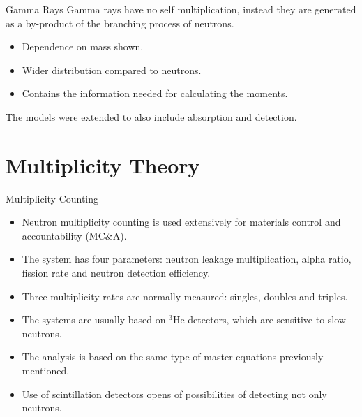 \documentclass[clock,style=horatio,paper=screen,blackslide,trans=Wipe,mode=present]{powerdot}
\begin{document}
\begin{slide}{Gamma Rays}
Gamma rays have no self multiplication, instead they are
    generated as a by-product of the branching process of
    neutrons.
{\vspace{1mm}\begin{itemize}
\item Dependence on mass shown.  \vspace{2mm}
\item Wider distribution compared to neutrons. \vspace{2mm}
\item Contains the information needed for calculating the moments.
\end{itemize}}\vspace{3mm}
The models were extended to also include absorption and
    detection.
\end{slide}



\section[slide=false]{Multiplicity Theory}

\begin{slide}{Multiplicity Counting}
\begin{itemize}
    \item Neutron multiplicity counting is used extensively
        for materials control and accountability (MC\&A). \\[2mm]
    \item The system has four parameters: neutron leakage
        multiplication, alpha ratio, fission rate and neutron
        detection efficiency.  \\[2mm]
    \item Three multiplicity rates are normally measured:
        singles, doubles and triples. \\[2mm]
    \item The systems are usually based on $^{3}$He-detectors,
        which are sensitive to slow neutrons. \\[2mm]
    \item The analysis is based on the same type of master
        equations previously mentioned. \\[2mm]
    \item Use of scintillation detectors opens of
        possibilities of detecting not only neutrons.
\end{itemize}
\end{slide}
\end{document}
